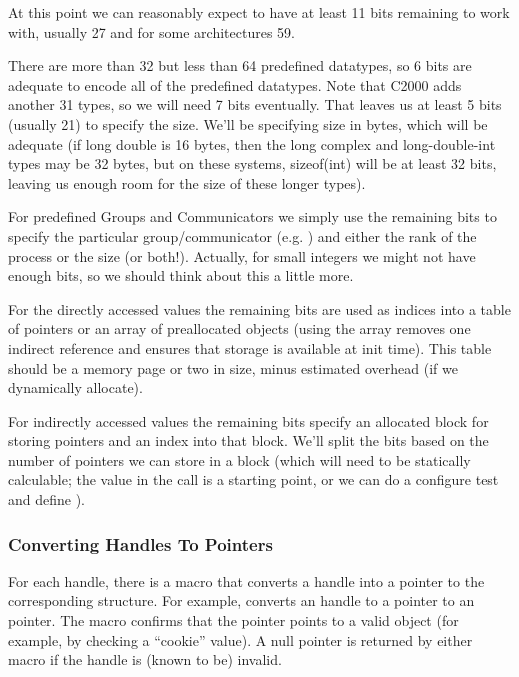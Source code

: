 \documentclass{article}
\begin{document}
At this point we can reasonably expect to have at least 11 bits remaining
to work with, usually 27 and for some architectures 59.

There are more than 32 but less than 64 predefined datatypes, so 6 bits are
adequate to encode all of the predefined datatypes.
Note that C2000 adds another 31 types, so we will need 7 bits eventually.
That leaves us at least 5 bits
(usually 21) to specify the size.  We'll be specifying size in bytes,
which will be adequate (if long double is 16 bytes, then the long complex and
long-double-int types may be 32 bytes, but on these systems, sizeof(int) will
be at least 32 bits, leaving us enough room for the size of these longer
types). 

For predefined Groups and Communicators we simply use the remaining bits
to specify the particular group/communicator (e.g. ) and 
either the rank of the process or the size (or both!).  Actually, for
small integers we  
might not have enough bits, so we should think about this a little more.

For the directly accessed values the remaining bits are used as indices into
a table of pointers or an array of preallocated objects (using the array
removes one indirect reference and ensures that storage is available at init
time).  This table should be 
a memory page or two in size, 
minus estimated  overhead (if we dynamically allocate).

For indirectly accessed values the remaining bits specify an allocated block
for storing pointers and an index into that block.  We'll split the bits
based on the number of pointers we can store in a block (which will need
to be statically calculable; the  value in the
 call is a starting point, or we can  do a configure test and
define ). 

\subsubsection{Converting Handles To Pointers}
\label{sec:handle-to-ptr}
For each handle, there is a macro  that converts a
handle into a pointer to the corresponding structure.  For example,
 converts an  handle to a pointer to an
 pointer.  The macro  confirms
that the pointer points to a valid object (for example, by checking a
``cookie'' value).  A null pointer is returned by either macro if the handle
is (known to be) invalid.
\end{document}
